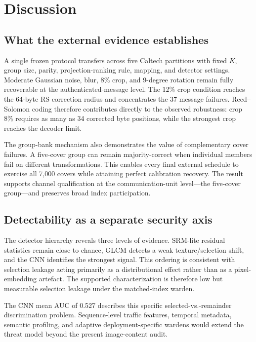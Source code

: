 \section{Discussion}
\label{sec:discussion}

\subsection{What the external evidence establishes}

A single frozen protocol transfers across five Caltech partitions with fixed $K$, group size, parity, projection-ranking rule, mapping, and detector settings. Moderate Gaussian noise, blur, 8\% crop, and 9-degree rotation remain fully recoverable at the authenticated-message level. The 12\% crop condition reaches the 64-byte RS correction radius and concentrates the 37 message failures. Reed--Solomon coding therefore contributes directly to the observed robustness: crop 8\% requires as many as 34 corrected byte positions, while the strongest crop reaches the decoder limit.

The group-bank mechanism also demonstrates the value of complementary cover failures. A five-cover group can remain majority-correct when individual members fail on different transformations. This enables every final external schedule to exercise all 7,000 covers while attaining perfect calibration recovery. The result supports channel qualification at the communication-unit level---the five-cover group---and preserves broad index participation.

\subsection{Detectability as a separate security axis}

The detector hierarchy reveals three levels of evidence. SRM-lite residual statistics remain close to chance, GLCM detects a weak texture/selection shift, and the CNN identifies the strongest signal. This ordering is consistent with selection leakage acting primarily as a distributional effect rather than as a pixel-embedding artefact. The supported characterization is therefore low but measurable selection leakage under the matched-index warden.

The CNN mean AUC of 0.527 describes this specific selected-vs.-remainder discrimination problem. Sequence-level traffic features, temporal metadata, semantic profiling, and adaptive deployment-specific wardens would extend the threat model beyond the present image-content audit.

